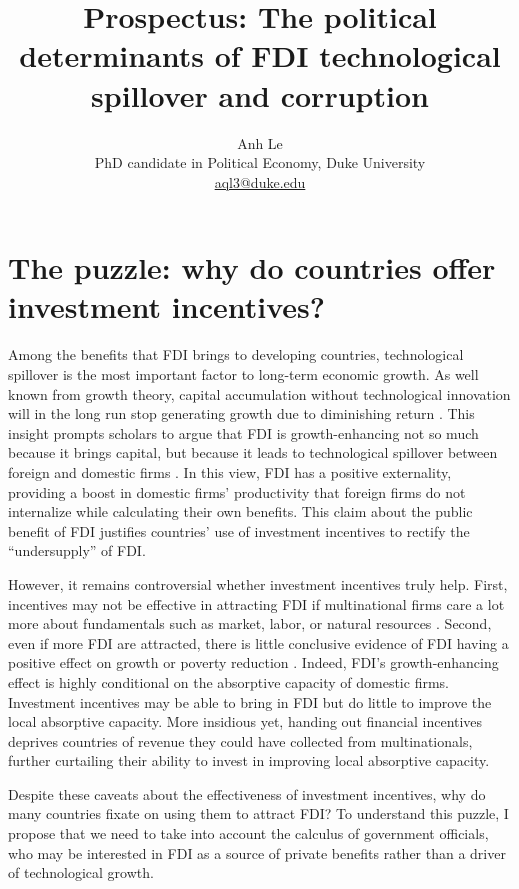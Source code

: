 \documentclass[12pt]{article}
\title{Prospectus: The political determinants of FDI technological spillover and corruption}
\author{Anh Le\\PhD candidate in Political Economy, Duke University\\\href{mailto:aql3@duke.edu}{aql3@duke.edu}}
\begin{document}
\maketitle

\section{The puzzle: why do countries offer investment incentives?}

Among the benefits that FDI brings to developing countries, technological spillover
is the most important factor to long-term economic growth. As well known from
growth theory, capital accumulation without
technological innovation 
will in the long run stop generating growth due to diminishing return \citep{Solow1956}.
This insight prompts scholars to argue that FDI is growth-enhancing
not so much because it brings capital, but because it leads to technological
spillover between foreign and domestic firms \citep{Nunnenkamp2004, Findlay1978}. In this view, FDI has a positive
externality, providing a boost in domestic firms' productivity that foreign
firms do not internalize while calculating their own benefits. This claim
about the public benefit of FDI justifies countries' use of investment incentives
to rectify the ``undersupply'' of FDI. 

However, it remains controversial whether investment incentives truly help. First,
incentives may not be effective in attracting FDI if multinational firms care a
lot more about fundamentals such as market, labor, or natural resources \citep{Blomstrom2002}. Second,
even if more FDI are attracted, there is little conclusive evidence of FDI
having a positive effect on growth \citep{Nair-Reichert2001, Carkovic2002} or
poverty reduction \citep{Guerra2009}. Indeed, FDI's
growth-enhancing effect is highly conditional on the absorptive capacity
of domestic firms. Investment incentives may be able to bring in FDI but do
little to improve the local absorptive capacity. More
insidious yet, handing out financial incentives deprives countries of revenue
they could have collected from multinationals, further curtailing their ability
to invest in improving local absorptive capacity.

Despite these caveats about the effectiveness of investment incentives, why do
many countries fixate on using them to attract FDI? To understand this puzzle, I propose that we need to take into account the
calculus of government officials, who may be interested in FDI as a source of private benefits rather than a driver of technological growth.
\end{document}
